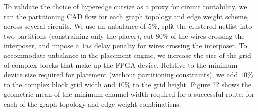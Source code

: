 To validate the choice of hyperedge cutsize as a proxy for circuit routability, we ran the partitioning CAD flow for each graph topology and edge weight scheme, across several circuits. We use an unbalance of $5\%$, split the clustered netlist into two partitions (constraining only the placer), cut $80\%$ of the wires crossing the interposer, and impose a $1ns$ delay penalty for wires crossing the interposer. To accommodate unbalance in the placement engine, we increase the size of the grid of complex blocks that make up the FPGA device. Relative to the minimum device size required for placement (without partitioning constraints), we add $10\%$ to the complex block grid width and $10\%$ to the grid height. Figure ?? shows the geometric mean of the minimum channel width required for a successful route, for each of the graph topology and edge weight combinations.
